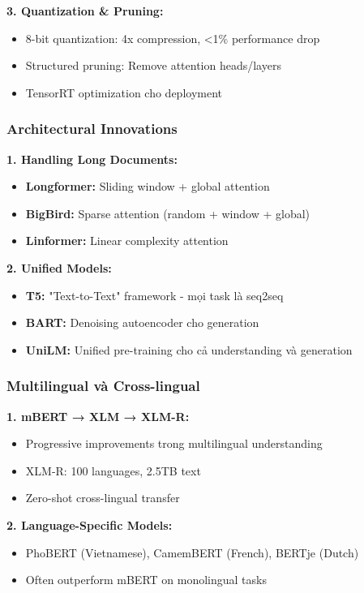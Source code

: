 \textbf{3. Quantization \& Pruning:}
\begin{itemize}
    \item 8-bit quantization: 4x compression, <1\% performance drop
    \item Structured pruning: Remove attention heads/layers
    \item TensorRT optimization cho deployment
\end{itemize}

\subsubsection{Architectural Innovations}

\textbf{1. Handling Long Documents:}
\begin{itemize}
    \item \textbf{Longformer:} Sliding window + global attention
    \item \textbf{BigBird:} Sparse attention (random + window + global)
    \item \textbf{Linformer:} Linear complexity attention
\end{itemize}

\textbf{2. Unified Models:}
\begin{itemize}
    \item \textbf{T5:} "Text-to-Text" framework - mọi task là seq2seq
    \item \textbf{BART:} Denoising autoencoder cho generation
    \item \textbf{UniLM:} Unified pre-training cho cả understanding và generation
\end{itemize}

\subsubsection{Multilingual và Cross-lingual}

\textbf{1. mBERT → XLM → XLM-R:}
\begin{itemize}
    \item Progressive improvements trong multilingual understanding
    \item XLM-R: 100 languages, 2.5TB text
    \item Zero-shot cross-lingual transfer
\end{itemize}

\textbf{2. Language-Specific Models:}
\begin{itemize}
    \item PhoBERT (Vietnamese), CamemBERT (French), BERTje (Dutch)
    \item Often outperform mBERT on monolingual tasks
\end{itemize}

